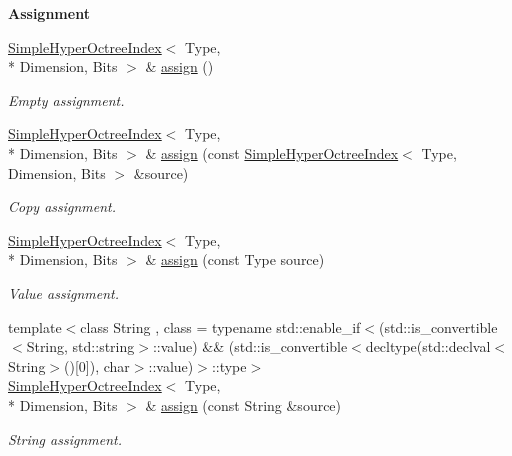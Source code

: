 \begin{Indent}{\bf Assignment}\par
\begin{DoxyCompactItemize}
\item 
\hyperlink{exceptionmagrathea_1_1SimpleHyperOctreeIndex}{Simple\-Hyper\-Octree\-Index}$<$ Type, \\*
Dimension, Bits $>$ \& \hyperlink{exceptionmagrathea_1_1SimpleHyperOctreeIndex_aa135ecc11227d9582643045125ecf553}{assign} ()
\begin{DoxyCompactList}\small\item\em Empty assignment. \end{DoxyCompactList}\item 
\hyperlink{exceptionmagrathea_1_1SimpleHyperOctreeIndex}{Simple\-Hyper\-Octree\-Index}$<$ Type, \\*
Dimension, Bits $>$ \& \hyperlink{exceptionmagrathea_1_1SimpleHyperOctreeIndex_a9359722d69a259e325e62a6f540fe672}{assign} (const \hyperlink{exceptionmagrathea_1_1SimpleHyperOctreeIndex}{Simple\-Hyper\-Octree\-Index}$<$ Type, Dimension, Bits $>$ \&source)
\begin{DoxyCompactList}\small\item\em Copy assignment. \end{DoxyCompactList}\item 
\hyperlink{exceptionmagrathea_1_1SimpleHyperOctreeIndex}{Simple\-Hyper\-Octree\-Index}$<$ Type, \\*
Dimension, Bits $>$ \& \hyperlink{exceptionmagrathea_1_1SimpleHyperOctreeIndex_acd39af20d66864438a4c9971ad4c10a6}{assign} (const Type source)
\begin{DoxyCompactList}\small\item\em Value assignment. \end{DoxyCompactList}\item 
{\footnotesize template$<$class String , class  = typename std\-::enable\-\_\-if$<$(std\-::is\-\_\-convertible$<$\-String, std\-::string$>$\-::value) \&\& (std\-::is\-\_\-convertible$<$decltype(std\-::declval$<$\-String$>$()\mbox{[}0\mbox{]}), char$>$\-::value)$>$\-::type$>$ }\\\hyperlink{exceptionmagrathea_1_1SimpleHyperOctreeIndex}{Simple\-Hyper\-Octree\-Index}$<$ Type, \\*
Dimension, Bits $>$ \& \hyperlink{exceptionmagrathea_1_1SimpleHyperOctreeIndex_a5c6ee3d4d1352b5212d96ab904b2f0ec}{assign} (const String \&source)
\begin{DoxyCompactList}\small\item\em String assignment. \end{DoxyCompactList}\end{DoxyCompactItemize}
\end{Indent}
